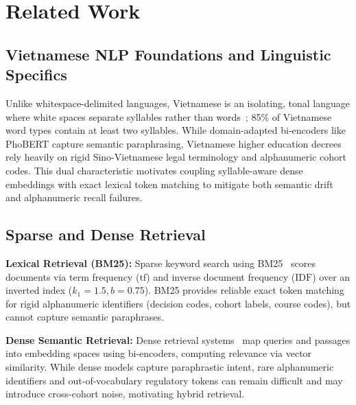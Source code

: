 \section{Related Work}
\label{sec:related}



\subsection{Vietnamese NLP Foundations and Linguistic Specifics}
\label{sec:vietnamese_nlp}

Unlike whitespace-delimited languages, Vietnamese is an isolating, tonal language where white spaces separate syllables rather than words~\cite{nguyen2020phobert}; 85\% of Vietnamese word types contain at least two syllables. While domain-adapted bi-encoders like PhoBERT capture semantic paraphrasing, Vietnamese higher education decrees rely heavily on rigid Sino-Vietnamese legal terminology and alphanumeric cohort codes. This dual characteristic motivates coupling syllable-aware dense embeddings with exact lexical token matching to mitigate both semantic drift and alphanumeric recall failures.

\subsection{Sparse and Dense Retrieval}
\label{sec:sparse_dense}

\textbf{Lexical Retrieval (BM25):} Sparse keyword search using BM25~\cite{robertson2009bm25} scores documents via term frequency ($\mathrm{tf}$) and inverse document frequency ($\mathrm{IDF}$) over an inverted index ($k_1 = 1.5, b = 0.75$). BM25 provides reliable exact token matching for rigid alphanumeric identifiers (decision codes, cohort labels, course codes), but cannot capture semantic paraphrases.

\textbf{Dense Semantic Retrieval:} Dense retrieval systems~\cite{karpukhin2020dpr,lewis2020rag} map queries and passages into embedding spaces using bi-encoders, computing relevance via vector similarity. While dense models capture paraphrastic intent, rare alphanumeric identifiers and out-of-vocabulary regulatory tokens can remain difficult and may introduce cross-cohort noise, motivating hybrid retrieval.


